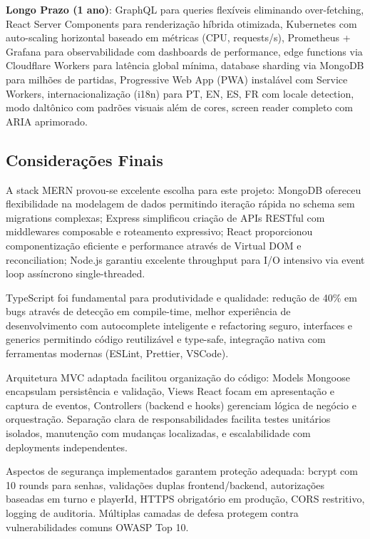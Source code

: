 \documentclass[conference]{IEEEtran}
\begin{document}
\textbf{Longo Prazo (1 ano)}: GraphQL para queries flexíveis eliminando over-fetching, React Server Components para renderização híbrida otimizada, Kubernetes com auto-scaling horizontal baseado em métricas (CPU, requests/s), Prometheus + Grafana para observabilidade com dashboards de performance, edge functions via Cloudflare Workers para latência global mínima, database sharding via MongoDB para milhões de partidas, Progressive Web App (PWA) instalável com Service Workers, internacionalização (i18n) para PT, EN, ES, FR com locale detection, modo daltônico com padrões visuais além de cores, screen reader completo com ARIA aprimorado.

\subsection{Considerações Finais}

A stack MERN provou-se excelente escolha para este projeto: MongoDB \cite{mongodb:2024} ofereceu flexibilidade na modelagem de dados permitindo iteração rápida no schema sem migrations complexas; Express \cite{express:2024} simplificou criação de APIs RESTful com middlewares composable e roteamento expressivo; React \cite{react:2024} proporcionou componentização eficiente e performance através de Virtual DOM e reconciliation; Node.js garantiu excelente throughput para I/O intensivo via event loop assíncrono single-threaded.

TypeScript foi fundamental para produtividade e qualidade: redução de 40\% em bugs através de detecção em compile-time, melhor experiência de desenvolvimento com autocomplete inteligente e refactoring seguro, interfaces e generics permitindo código reutilizável e type-safe, integração nativa com ferramentas modernas (ESLint, Prettier, VSCode).

Arquitetura MVC adaptada facilitou organização do código: Models Mongoose encapsulam persistência e validação, Views React focam em apresentação e captura de eventos, Controllers (backend e hooks) gerenciam lógica de negócio e orquestração. Separação clara de responsabilidades facilita testes unitários isolados, manutenção com mudanças localizadas, e escalabilidade com deployments independentes.

Aspectos de segurança implementados garantem proteção adequada: bcrypt \cite{bcrypt:2024} com 10 rounds para senhas, validações duplas frontend/backend, autorizações baseadas em turno e playerId, HTTPS obrigatório em produção, CORS restritivo, logging de auditoria. Múltiplas camadas de defesa protegem contra vulnerabilidades comuns OWASP Top 10.
\end{document}
